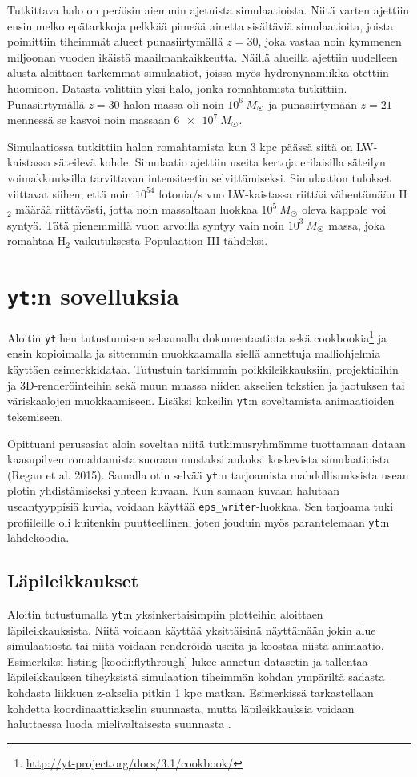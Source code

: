 \documentclass[12pt,a4paper]{article}
\newcommand{\yt}{\texttt{yt}}
\begin{document}
Tutkittava halo on peräisin aiemmin ajetuista simulaatioista. Niitä varten ajettiin ensin melko epätarkkoja pelkkää pimeää ainetta sisältäviä simulaatioita, joista poimittiin tiheimmät alueet punasiirtymällä $z=30$, joka vastaa noin kymmenen miljoonan vuoden ikäistä maailmankaikkeutta. Näillä alueilla ajettiin uudelleen alusta aloittaen tarkemmat simulaatiot, joissa myös hydronynamiikka otettiin huomioon. Datasta valittiin yksi halo, jonka romahtamista tutkittiin. Punasiirtymällä $z = 30$ halon massa oli noin $10^6~M_{\astrosun}$ ja punasiirtymään $z = 21$ mennessä se kasvoi noin massaan $\SI{6e7}{} M_{\astrosun}$. \cite{rj}

Simulaatiossa tutkittiin halon romahtamista kun 3 kpc päässä siitä on LW-kaistassa säteilevä kohde. Simulaatio ajettiin useita kertoja erilaisilla säteilyn voimakkuuksilla tarvittavan intensiteetin selvittämiseksi. Simulaation tulokset viittavat siihen, että noin $10^{54}$ fotonia/s vuo LW-kaistassa riittää vähentämään H$_2$ määrää riittävästi, jotta noin massaltaan luokkaa $10^5~M_{\astrosun}$ oleva kappale voi syntyä. Tätä pienemmillä vuon arvoilla syntyy vain noin $10^3~M_{\astrosun}$ massa, joka romahtaa H$_2$ vaikutuksesta Populaation III tähdeksi. \cite{rj}

\section{\yt :n sovelluksia}
Aloitin \yt :hen tutustumisen selaamalla dokumentaatiota sekä cookbookia\footnote{\url{http://yt-project.org/docs/3.1/cookbook/}} ja ensin kopioimalla ja sittemmin muokkaamalla siellä annettuja malliohjelmia käyttäen esimerkkidataa. Tutustuin tarkimmin poikkileikkauksiin, projektioihin ja 3D-renderöinteihin sekä muun muassa niiden akselien tekstien ja jaotuksen tai väriskaalojen muokkaamiseen. Lisäksi kokeilin \yt :n soveltamista animaatioiden tekemiseen.

Opittuani perusasiat aloin soveltaa niitä tutkimusryhmämme tuottamaan dataan kaasupilven romahtamista suoraan mustaksi aukoksi koskevista simulaatioista (Regan et al. 2015). Samalla otin selvää \yt :n tarjoamista mahdollisuuksista usean plotin yhdistämiseksi yhteen kuvaan. Kun samaan kuvaan halutaan useantyyppisiä kuvia, voidaan käyttää \texttt{eps\_writer}-luokkaa. Sen tarjoama tuki profiileille oli kuitenkin puutteellinen, joten jouduin myös parantelemaan \yt :n lähdekoodia.

\subsection{Läpileikkaukset}
Aloitin tutustumalla \yt :n yksinkertaisimpiin plotteihin aloittaen läpileikkauksista. Niitä voidaan käyttää yksittäisinä näyttämään jokin alue simulaatiosta tai niitä voidaan renderöidä useita ja koostaa niistä animaatio. Esimerkiksi listing \ref{koodi:flythrough} lukee annetun datasetin ja tallentaa läpileikkauksen tiheyksistä simulaation tiheimmän kohdan ympäriltä sadasta kohdasta liikkuen z-akselia pitkin 1 kpc matkan. Esimerkissä tarkastellaan kohdetta koordinaattiakselin suunnasta, mutta läpileikkauksia voidaan haluttaessa luoda mielivaltaisesta suunnasta \cite{sliceproj}.
\end{document}
